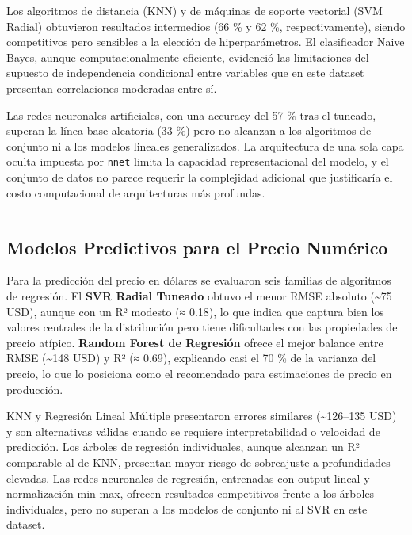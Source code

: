 \documentclass[
]{article}
\begin{document}
Los algoritmos de distancia (KNN) y de máquinas de soporte vectorial
(SVM Radial) obtuvieron resultados intermedios (66 \% y 62 \%,
respectivamente), siendo competitivos pero sensibles a la elección de
hiperparámetros. El clasificador Naive Bayes, aunque computacionalmente
eficiente, evidenció las limitaciones del supuesto de independencia
condicional entre variables que en este dataset presentan correlaciones
moderadas entre sí.

Las redes neuronales artificiales, con una accuracy del 57 \% tras el
tuneado, superan la línea base aleatoria (33 \%) pero no alcanzan a los
algoritmos de conjunto ni a los modelos lineales generalizados. La
arquitectura de una sola capa oculta impuesta por \texttt{nnet} limita
la capacidad representacional del modelo, y el conjunto de datos no
parece requerir la complejidad adicional que justificaría el costo
computacional de arquitecturas más profundas.

\begin{center}\rule{0.5\linewidth}{0.5pt}\end{center}

\subsection{Modelos Predictivos para el Precio
Numérico}\label{modelos-predictivos-para-el-precio-numuxe9rico}

Para la predicción del precio en dólares se evaluaron seis familias de
algoritmos de regresión. El \textbf{SVR Radial Tuneado} obtuvo el menor
RMSE absoluto (\textasciitilde75 USD), aunque con un R² modesto (≈
0.18), lo que indica que captura bien los valores centrales de la
distribución pero tiene dificultades con las propiedades de precio
atípico. \textbf{Random Forest de Regresión} ofrece el mejor balance
entre RMSE (\textasciitilde148 USD) y R² (≈ 0.69), explicando casi el 70
\% de la varianza del precio, lo que lo posiciona como el recomendado
para estimaciones de precio en producción.

KNN y Regresión Lineal Múltiple presentaron errores similares
(\textasciitilde126--135 USD) y son alternativas válidas cuando se
requiere interpretabilidad o velocidad de predicción. Los árboles de
regresión individuales, aunque alcanzan un R² comparable al de KNN,
presentan mayor riesgo de sobreajuste a profundidades elevadas. Las
redes neuronales de regresión, entrenadas con output lineal y
normalización min-max, ofrecen resultados competitivos frente a los
árboles individuales, pero no superan a los modelos de conjunto ni al
SVR en este dataset.
\end{document}
